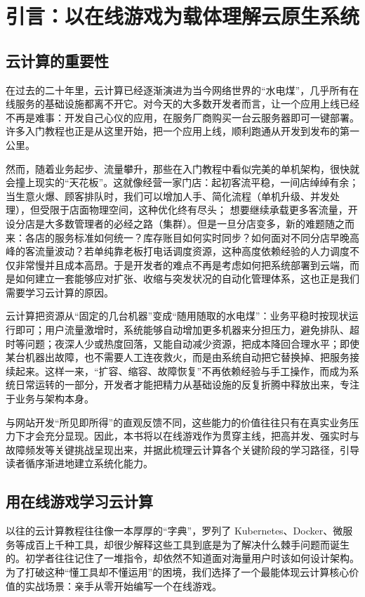 \section*{\centering 引言：以在线游戏为载体理解云原生系统}
\subsection*{云计算的重要性}
在过去的二十年里，云计算已经逐渐演进为当今网络世界的“水电煤”，几乎所有在线服务的基础设施都离不开它。对今天的大多数开发者而言，让一个应用上线已经不再是难事：开发自己心仪的应用，在服务厂商购买一台云服务器即可一键部署。许多入门教程也正是从这里开始，把一个应用上线，顺利跑通从开发到发布的第一公里。

然而，随着业务起步、流量攀升，那些在入门教程中看似完美的单机架构，很快就会撞上现实的“天花板”。这就像经营一家门店：起初客流平稳，一间店绰绰有余；当生意火爆、顾客排队时，我们可以增加人手、简化流程（单机升级、并发处理），但受限于店面物理空间，这种优化终有尽头；
想要继续承载更多客流量，开设分店是大多数管理者的必经之路（集群）。但是一旦分店变多，新的难题随之而来：各店的服务标准如何统一？库存账目如何实时同步？如何面对不同分店早晚高峰的客流量波动？若单纯靠老板打电话调度资源，这种高度依赖经验的人力调度不仅非常慢并且成本高昂。于是开发者的难点不再是考虑如何把系统部署到云端，而是如何建立一套能够应对扩张、收缩与突发状况的自动化管理体系，这也正是我们需要学习云计算的原因。

云计算把资源从“固定的几台机器”变成“随用随取的水电煤”：业务平稳时按现状运行即可；用户流量激增时，系统能够自动增加更多机器来分担压力，避免排队、超时等问题；夜深人少或热度回落，又能自动减少资源，把成本降回合理水平；即使某台机器出故障，也不需要人工连夜救火，而是由系统自动把它替换掉、把服务接续起来。这样一来，“扩容、缩容、故障恢复”不再依赖经验与手工操作，而成为系统日常运转的一部分，开发者才能把精力从基础设施的反复折腾中释放出来，专注于业务与架构本身。

与网站开发“所见即所得”的直观反馈不同，这些能力的价值往往只有在真实业务压力下才会充分显现。因此，本书将以在线游戏作为贯穿主线，把高并发、强实时与故障频发等关键挑战呈现出来，并据此梳理云计算各个关键阶段的学习路径，引导读者循序渐进地建立系统化能力。


\subsection*{用在线游戏学习云计算}

以往的云计算教程往往像一本厚厚的“字典”，罗列了 Kubernetes、Docker、微服务等成百上千种工具，却很少解释这些工具到底是为了解决什么棘手问题而诞生的。初学者往往记住了一堆指令，却依然不知道面对海量用户时该如何设计架构。为了打破这种“懂工具却不懂运用”的困境，我们选择了一个最能体现云计算核心价值的实战场景：亲手从零开始编写一个在线游戏。

